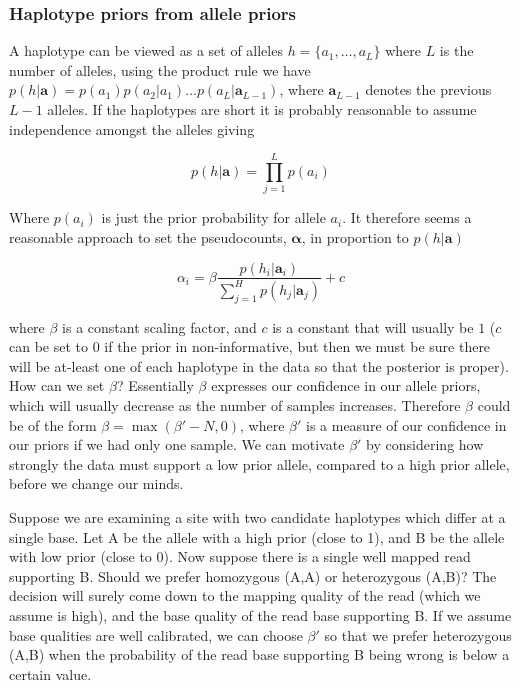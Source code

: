 \documentclass{article}
\begin{document}
\subsubsection{Haplotype priors from allele priors}

A haplotype can be viewed as a set of alleles $h = \{a_1, \dots, a_L\}$ where $L$ is the number of alleles, using the product rule we have $p(h | \boldsymbol{a}) = p(a_1)p(a_2 | a_1)\dots p(a_L | \boldsymbol{a}_{L-1})$, where $\boldsymbol{a}_{L-1}$ denotes the previous $L-1$ alleles. If the haplotypes are short it is probably reasonable to assume independence amongst the alleles giving

\begin{equation}
    p(h | \boldsymbol{a}) = \prod_{j = 1}^L p(a_i)
\end{equation}

Where $p(a_i)$ is just the prior probability for allele $a_i$. It therefore seems a reasonable approach to set the pseudocounts, $\boldsymbol{\alpha}$, in proportion to $p(h | \boldsymbol{a})$

\begin{equation}
    \alpha_i = \beta \frac{p(h_i | \boldsymbol{a}_i)}{\sum_{j = 1}^H p(h_j | \boldsymbol{a}_j)} + c
\end{equation}

where $\beta$ is a constant scaling factor, and $c$ is a constant that will usually be $1$ ($c$ can be set to $0$ if the prior in non-informative, but then we must be sure there will be at-least one of each haplotype in the data so that the posterior is proper). How can we set $\beta$? Essentially $\beta$ expresses our confidence in our allele priors, which will usually decrease as the number of samples increases. Therefore $\beta$ could be of the form $\beta = \max(\beta' - N, 0)$, where $\beta'$ is a measure of our confidence in our priors if we had only one sample. We can motivate $\beta'$ by considering how strongly the data must support a low prior allele, compared to a high prior allele, before we change our minds.

Suppose we are examining a site with two candidate haplotypes which differ at a single base. Let A be the allele with a high prior (close to 1), and B be the allele with low prior (close to 0). Now suppose there is a single well mapped read supporting B. Should we prefer homozygous (A,A) or heterozygous (A,B)? The decision will surely come down to the mapping quality of the read (which we assume is high), and the base quality of the read base supporting B. If we assume base qualities are well calibrated, we can choose $\beta'$ so that we prefer heterozygous (A,B) when the probability of the read base supporting B being wrong is below a certain value.
\end{document}
